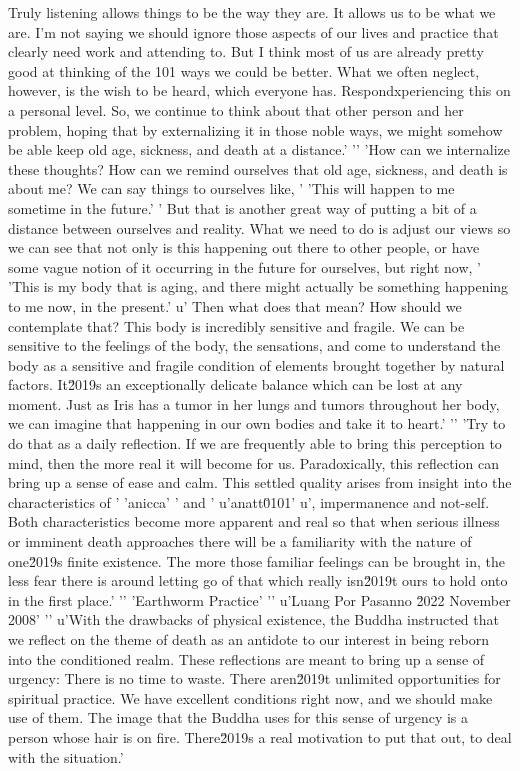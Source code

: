 Truly listening allows things to be the way they are. It allows us to 
be what we are. I'm not saying we should ignore those aspects of our 
lives and practice that clearly need work and attending to. But I think 
most of us are already pretty good at thinking of the 101 ways we could 
be better. What we often neglect, however, is the wish to be heard, 
which everyone has. Respondxperiencing this on a personal level. So, we continue to think about that other person and her problem, hoping that by externalizing it in those noble ways, we might somehow be able keep old age, sickness, and death at a distance.'
'\n'
'How can we internalize these thoughts? How can we remind ourselves that old age, sickness, and death is about me? We can say things to ourselves like, '
'This will happen to me sometime in the future.'
' But that is another great way of putting a bit of a distance between ourselves and reality. What we need to do is adjust our views so we can see that not only is this happening out there to other people, or have some vague notion of it occurring in the future for ourselves, but right now, '
'This is my body that is aging, and there might actually be something happening to me now, in the present.'
u' Then what does that mean? How should we contemplate that? This body is incredibly sensitive and fragile. We can be sensitive to the feelings of the body, the sensations, and come to understand the body as a sensitive and fragile condition of elements brought together by natural factors. It\u2019s an exceptionally delicate balance which can be lost at any moment. Just as Iris has a tumor in her lungs and tumors throughout her body, we can imagine that happening in our own bodies and take it to heart.'
'\n'
'Try to do that as a daily reflection. If we are frequently able to bring this perception to mind, then the more real it will become for us. Paradoxically, this reflection can bring up a sense of ease and calm. This settled quality arises from insight into the characteristics of '
'anicca'
' and '
u'anatt\u0101'
u', impermanence and not-self. Both characteristics become more apparent and real so that when serious illness or imminent death approaches there will be a familiarity with the nature of one\u2019s finite existence. The more those familiar feelings can be brought in, the less fear there is around letting go of that which really isn\u2019t ours to hold onto in the first place.'
'\n'
'Earthworm Practice'
'\n'
u'Luang Por Pasanno \u2022 November 2008'
'\n'
u'With the drawbacks of physical existence, the Buddha instructed that we reflect on the theme of death as an antidote to our interest in being reborn into the conditioned realm. These reflections are meant to bring up a sense of urgency: There is no time to waste. There aren\u2019t unlimited opportunities for spiritual practice. We have excellent conditions right now, and we should make use of them. The image that the Buddha uses for this sense of urgency is a person whose hair is on fire. There\u2019s a real motivation to put that out, to deal with the situation.'
